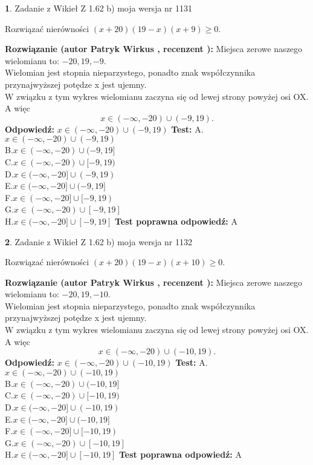 \documentclass[12pt, a4paper]{article}
\theoremstyle{definition} %
\newtheorem{zad}{}
\newcommand{\zadStart}[1]{\begin{zad}#1\newline}
\newcommand{\zadStop}{\end{zad}}
\newcommand{\rozwStart}[2]{\noindent \textbf{Rozwiązanie (autor #1 , recenzent #2): }\newline}
\newcommand{\rozwStop}{\newline}
\newcommand{\odpStart}{\noindent \textbf{Odpowiedź:}\newline}
\newcommand{\odpStop}{\newline}
\newcommand{\testStart}{\noindent \textbf{Test:}\newline}
\newcommand{\testStop}{\newline}
\newcommand{\kluczStart}{\noindent \textbf{Test poprawna odpowiedź:}\newline}
\newcommand{\kluczStop}{\newline}
\begin{document}
\zadStart{Zadanie z Wikieł Z 1.62 b) moja wersja nr 1131}

Rozwiązać nierówności $(x+20)(19-x)(x+9)\ge0$.
\zadStop
\rozwStart{Patryk Wirkus}{}
Miejsca zerowe naszego wielomianu to: $-20, 19, -9$.\\
Wielomian jest stopnia nieparzystego, ponadto znak współczynnika przy\linebreak najwyższej potędze x jest ujemny.\\ W związku z tym wykres wielomianu zaczyna się od lewej strony powyżej osi OX. A więc $$x \in (-\infty,-20) \cup (-9,19).$$
\rozwStop
\odpStart
$x \in (-\infty,-20) \cup (-9,19)$
\odpStop
\testStart
A.$x \in (-\infty,-20) \cup (-9,19)$\\
B.$x \in (-\infty,-20) \cup (-9,19]$\\
C.$x \in (-\infty,-20) \cup [-9,19)$\\
D.$x \in (-\infty,-20] \cup (-9,19)$\\
E.$x \in (-\infty,-20] \cup (-9,19]$\\
F.$x \in (-\infty,-20] \cup [-9,19)$\\
G.$x \in (-\infty,-20) \cup [-9,19]$\\
H.$x \in (-\infty,-20] \cup [-9,19]$
\testStop
\kluczStart
A
\kluczStop



\zadStart{Zadanie z Wikieł Z 1.62 b) moja wersja nr 1132}

Rozwiązać nierówności $(x+20)(19-x)(x+10)\ge0$.
\zadStop
\rozwStart{Patryk Wirkus}{}
Miejsca zerowe naszego wielomianu to: $-20, 19, -10$.\\
Wielomian jest stopnia nieparzystego, ponadto znak współczynnika przy\linebreak najwyższej potędze x jest ujemny.\\ W związku z tym wykres wielomianu zaczyna się od lewej strony powyżej osi OX. A więc $$x \in (-\infty,-20) \cup (-10,19).$$
\rozwStop
\odpStart
$x \in (-\infty,-20) \cup (-10,19)$
\odpStop
\testStart
A.$x \in (-\infty,-20) \cup (-10,19)$\\
B.$x \in (-\infty,-20) \cup (-10,19]$\\
C.$x \in (-\infty,-20) \cup [-10,19)$\\
D.$x \in (-\infty,-20] \cup (-10,19)$\\
E.$x \in (-\infty,-20] \cup (-10,19]$\\
F.$x \in (-\infty,-20] \cup [-10,19)$\\
G.$x \in (-\infty,-20) \cup [-10,19]$\\
H.$x \in (-\infty,-20] \cup [-10,19]$
\testStop
\kluczStart
A
\kluczStop
\end{document}
